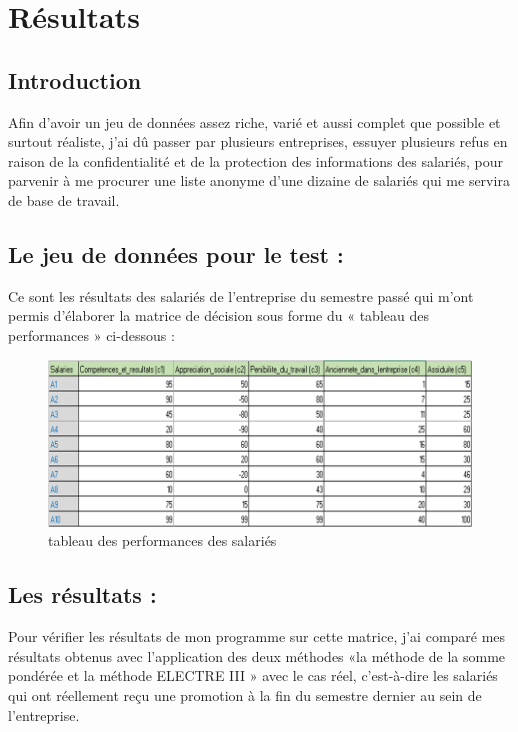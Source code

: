 \chapter{Résultats}

\section{Introduction}
Afin d’avoir un jeu de données assez riche, varié et aussi complet que possible et surtout réaliste, j’ai dû passer par plusieurs entreprises, essuyer plusieurs refus en raison de la confidentialité et de la protection des informations des salariés, pour parvenir à me procurer une liste anonyme d’une dizaine de salariés qui me servira de base de travail.

\section{Le jeu de données pour le test :}
Ce sont les résultats des salariés de l’entreprise du semestre passé qui m'ont permis d'élaborer la matrice de décision sous forme du « tableau des performances » ci-dessous : 

\begin{figure}[!h]
\begin{center}
\includegraphics{Tests_resultats/performances_salaries.png}
\end{center}
\caption{tableau des performances des salariés}
\end{figure}

\section{Les résultats :}
Pour vérifier les résultats de mon programme sur cette matrice, j’ai comparé mes résultats obtenus avec l’application des deux méthodes «la méthode de la somme pondérée et la méthode ELECTRE III » avec le cas réel, c’est-à-dire les salariés qui ont réellement reçu une promotion à la fin du semestre dernier au sein de l’entreprise.
\newpage


